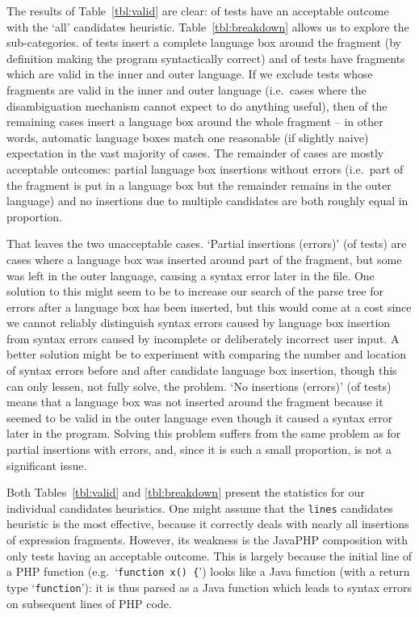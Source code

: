 \documentclass[sigplan,screen]{acmart}
\begin{document}
The results of Table~\ref{tbl:valid} are clear: \validalloverall of tests have
an acceptable outcome with the `all' candidates heuristic. Table~\ref{tbl:breakdown} allows us to explore the
sub-categories. \breakdownallvalidsame of tests insert a complete language box
around the fragment (by definition making the program syntactically correct) and
\breakdownallnovalid of tests have fragments which are valid in the inner and
outer language. If we exclude tests whose fragments are valid in the inner and
outer language (i.e.~cases where the disambiguation mechanism cannot
expect to do anything useful), then \breakdownallexclude of the remaining cases
insert a language box around the whole fragment --
in other words, automatic language boxes match one reasonable (if slightly
naive) expectation in the vast majority of cases. The remainder of cases are
mostly acceptable outcomes: partial language box insertions without errors
(i.e.~part of the fragment is put in a language box but the remainder remains
in the outer language) and no insertions due to multiple candidates are both roughly
equal in proportion.

That leaves the two unacceptable cases. `Partial insertions (errors)'
(\breakdownallinvaliddiff of tests) are cases where a language box was inserted
around part of the fragment, but some was left in the outer language, causing a
syntax error later in the file. One solution to this might seem to be to
increase our search of the parse tree for errors after a language box has been
inserted, but this would come at a cost since we cannot reliably distinguish syntax
errors caused by language box insertion from syntax errors caused by
incomplete or deliberately incorrect user input. A better solution might be to
experiment with comparing the number and location of syntax errors before and
after candidate language box insertion, though this can only lessen, not fully
solve, the problem. `No insertions (errors)' (\breakdownallnoerror of tests) means that a language box was not
inserted around the fragment because it seemed to be valid in the outer
language even though it caused a syntax error later in the program.
Solving this problem suffers from the same
problem as for partial insertions with errors, and, since it is such a small
proportion, is not a significant issue.

Both Tables~\ref{tbl:valid} and \ref{tbl:breakdown} present the statistics for
our individual candidates heuristics. One might assume that the \texttt{lines}
candidates heuristic is the most effective, because it correctly deals with
nearly all insertions of expression fragments. However, its weakness is the
JavaPHP composition with only \validlinejavaphp tests having an acceptable
outcome. This is largely because the initial line of a PHP function
(e.g.~`\texttt{function x() \{}') looks like a Java function (with a return type
`\texttt{function}'): it is thus parsed as a Java function which leads to syntax
errors on subsequent lines of PHP code.
\end{document}
